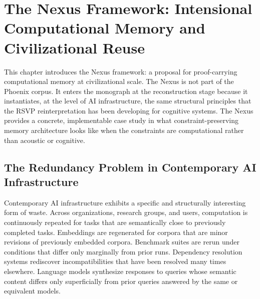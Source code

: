 
\chapter{The Nexus Framework: Intensional Computational Memory and Civilizational Reuse}
\label{ch:nexus}


\noindent
This chapter introduces the Nexus framework: a proposal for
proof-carrying computational memory at civilizational scale.
The Nexus is not part of the Phoenix corpus. It enters the
monograph at the reconstruction stage because it instantiates,
at the level of AI infrastructure, the same structural
principles that the RSVP reinterpretation has been developing
for cognitive systems. The Nexus provides a concrete, implementable
case study in what constraint-preserving memory architecture
looks like when the constraints are computational rather than
acoustic or cognitive.

\section{The Redundancy Problem in Contemporary AI Infrastructure}
\label{sec:redundancy-problem}

Contemporary AI infrastructure exhibits a specific and
structurally interesting form of waste. Across organizations,
research groups, and users, computation is continuously
repeated for tasks that are semantically close to previously
completed tasks. Embeddings are regenerated for corpora that
are minor revisions of previously embedded corpora. Benchmark
suites are rerun under conditions that differ only marginally
from prior runs. Dependency resolution systems rediscover
incompatibilities that have been resolved many times
elsewhere. Language models synthesize responses to queries
whose semantic content differs only superficially from
prior queries answered by the same or equivalent models.


